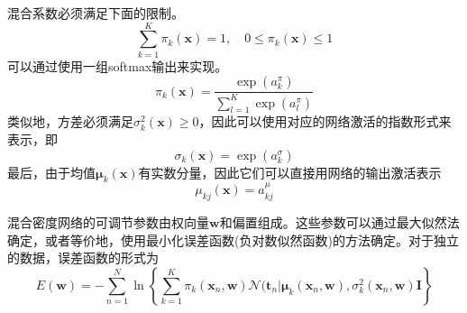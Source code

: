 混合系数必须满足下面的限制。
\begin{equation}
	\sum_{k=1}^{K}\pi_k(\boldsymbol{x})=1,\quad 0\leqslant \pi_k(\boldsymbol{x}) \leqslant 1
\end{equation}
可以通过使用一组softmax输出来实现。
\begin{equation}
	\pi_k(\boldsymbol{x})=\frac{\exp (a_k^{\pi})}{\sum_{l=1}^{K}\exp (a_l^{\pi})}
\end{equation}
类似地，方差必须满足$\sigma_k^2(\boldsymbol{x})\geqslant 0$，因此可以使用对应的网络激活的指数形式来表示，即
\begin{equation}
	\sigma_k(\boldsymbol{x})=\exp (a_k^{\sigma})
\end{equation}
最后，由于均值$\boldsymbol{\mu}_k(\boldsymbol{x})$有实数分量，因此它们可以直接用网络的输出激活表示
\begin{equation}
	\mu_{kj}(\boldsymbol{x})=a_{kj}^{\mu}
\end{equation}

混合密度网络的可调节参数由权向量$\boldsymbol{w}$和偏置组成。这些参数可以通过最大似然法确定，或者等价地，使用最小化误差函数(负对数似然函数)的方法确定。对于独立的数据，误差函数的形式为
\begin{equation}
	E(\boldsymbol{w})=-\sum_{n=1}^{N}\ln \left\{\sum_{k=1}^{K}\pi_k(\boldsymbol{x}_n,\boldsymbol{w})\mathcal{N}(\boldsymbol{t}_n|\boldsymbol{\mu}_k(\boldsymbol{x}_n,\boldsymbol{w}),\sigma_k^2(\boldsymbol{x}_n,\boldsymbol{w})\boldsymbol{I} \right\}
\end{equation}
